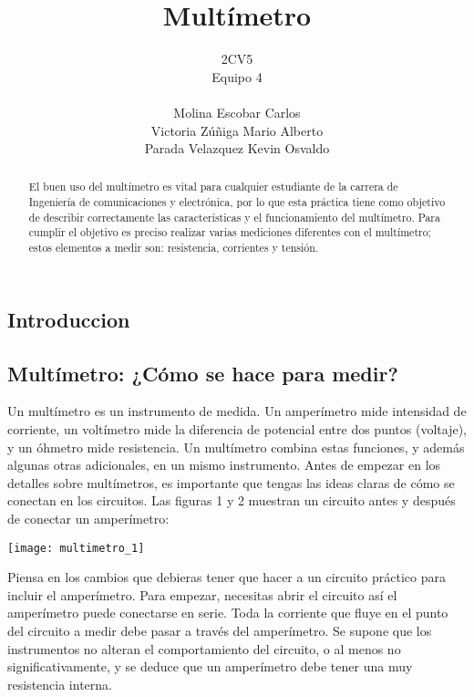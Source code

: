 \documentclass[11pt]{article}
\title{Multímetro}
\author{2CV5\\Equipo 4\\\\Molina Escobar Carlos\\Victoria Zúñiga Mario Alberto\\Parada Velazquez Kevin Osvaldo}
\date{}
\newenvironment{Figuras}
  {\par\medskip\noindent\minipage{\linewidth}}
  {\endminipage\par\medskip}
\begin{document}
	
\maketitle

\begin{abstract}
	El buen uso del multímetro es vital para cualquier estudiante de la carrera de Ingeniería de comunicaciones y electrónica, por lo que esta práctica tiene como objetivo de describir correctamente las características y el funcionamiento del multímetro. Para cumplir el objetivo es preciso realizar varias mediciones diferentes con el multímetro; estos elementos a medir son: resistencia, corrientes y tensión.
\end{abstract}


\begin{multicols}{2}
\section{Introduccion}
	\subsection{Multímetro: ¿Cómo se hace para medir?}
Un multímetro es un instrumento de medida. Un amperímetro mide
intensidad de corriente, un voltímetro mide la diferencia de potencial
entre dos puntos (voltaje), y un óhmetro mide resistencia. Un
multímetro combina estas funciones, y además algunas otras
adicionales, en un mismo instrumento.
Antes de empezar en los detalles sobre multímetros, es importante que
tengas las ideas claras de cómo se conectan en los circuitos. Las figuras 1 y 2 muestran un circuito antes y después de conectar un amperímetro:

\begin{Figuras}
	\centering
    \texttt{[image: multimetro\_1]}
    \label{fig:mesh1}
\end{Figuras}

Piensa en los cambios que debieras tener que hacer a un circuito
práctico para incluir el amperímetro. Para empezar, necesitas abrir el
circuito así el amperímetro puede conectarse en serie. Toda la corriente
que fluye en el punto del circuito a medir debe pasar a través del
amperímetro. Se supone que los instrumentos no alteran el
comportamiento del circuito, o al menos no significativamente, y se
deduce que un amperímetro debe tener una muy resistencia
interna.


\end{multicols}
\end{document}

